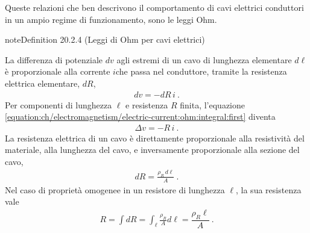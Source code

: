 \documentclass[letterpaper,10pt,italian]{jupyterBook}
\begin{document}
\sphinxAtStartPar
Queste relazioni che ben descrivono il comportamento di cavi elettrici conduttori in un ampio regime di funzionamento, sono le leggi Ohm.
\label{ch/electromagnetism/electric-current:definition-3}
\begin{sphinxadmonition}{note}{Definition 20.2.4 (Leggi di Ohm per cavi elettrici)}



\sphinxAtStartPar
{} La differenza di potenziale \(dv\) agli estremi di un cavo di lunghezza elementare \(d \ell\) è proporzionale alla corrente \(i\)che passa nel conduttore, tramite la resistenza elettrica elementare, \(d R\),
\begin{equation}\label{equation:ch/electromagnetism/electric-current:ohm:integral:first}
\begin{split}dv = - dR \, i \ .\end{split}
\end{equation}
\sphinxAtStartPar
Per componenti di lunghezza \(\ell\) e resistenza \(R\) finita, l’equazione \eqref{equation:ch/electromagnetism/electric-current:ohm:integral:first} diventa
\begin{equation}\label{equation:ch/electromagnetism/electric-current:ohm:integral:first:R}
\begin{split}\Delta v = - R \, i \ .\end{split}
\end{equation}
\sphinxAtStartPar
{} La resistenza elettrica di un cavo è direttamente proporzionale alla resistività del materiale, alla lunghezza del cavo, e inversamente proporzionale alla sezione del cavo,
\begin{equation}\label{equation:ch/electromagnetism/electric-current:ohm:integral:second}
\begin{split}dR = \frac{\rho_R \, d\ell}{A} \ .\end{split}
\end{equation}
\sphinxAtStartPar
Nel caso di proprietà omogenee in un resistore di lunghezza \(\ell\), la sua resistenza vale
\begin{equation*}
\begin{split}R = \int d R = \int_{\ell} \frac{\rho_R}{A} d \ell = \dfrac{\rho_R \ell}{A} \ .\end{split}
\end{equation*}\end{sphinxadmonition}
\label{ch/electromagnetism/electric-current:example-4}
\end{document}
